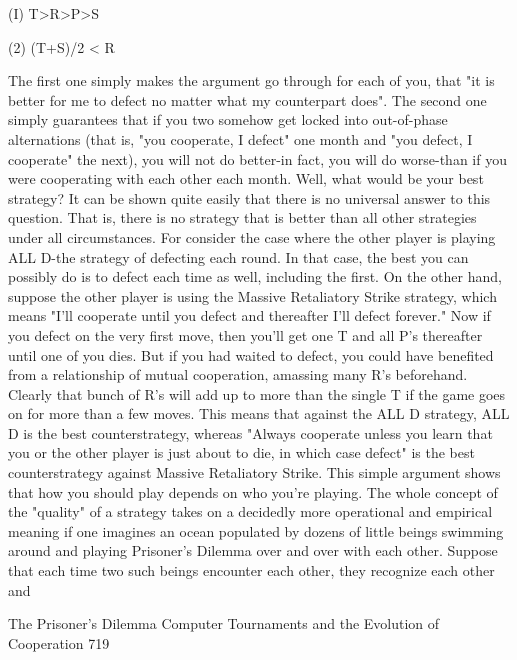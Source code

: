                                       (I) T>R>P>S

                                     (2) (T+S)/2 < R

        The first one simply makes the argument go through for each of you, that "it is
better for me to defect no matter what my counterpart does". The second one simply
guarantees that if you two somehow get locked into out-of-phase alternations (that is,
"you cooperate, I defect" one month and "you defect, I cooperate" the next), you will not
do better-in fact, you will do worse-than if you were cooperating with each other each
month.
        Well, what would be your best strategy? It can be shown quite easily that there is
no universal answer to this question. That is, there is no strategy that is better than all
other strategies under all circumstances. For consider the case where the other player is
playing ALL D-the strategy of defecting each round. In that case, the best you can
possibly do is to defect each time as well, including the first. On the other hand, suppose
the other player is using the Massive Retaliatory Strike strategy, which means "I'll
cooperate until you defect and thereafter I'll defect forever." Now if you defect on the
very first move, then you'll get one T and all P's thereafter until one of you dies. But if
you had waited to defect, you could have benefited from a relationship of mutual
cooperation, amassing many R's beforehand. Clearly that bunch of R's will add up to
more than the single T if the game goes on for more than a few moves. This means that
against the ALL D strategy, ALL D is the best counterstrategy, whereas "Always
cooperate unless you learn that you or the other player is just about to die, in which case
defect" is the best counterstrategy against Massive Retaliatory Strike. This simple
argument shows that how you should play depends on who you're playing.
        The whole concept of the "quality" of a strategy takes on a decidedly more
operational and empirical meaning if one imagines an ocean populated by dozens of little
beings swimming around and playing Prisoner's Dilemma over and over with each other.
Suppose that each time two such beings encounter each other, they recognize each other
and




The Prisoner's Dilemma Computer Tournaments and the Evolution of Cooperation           719

